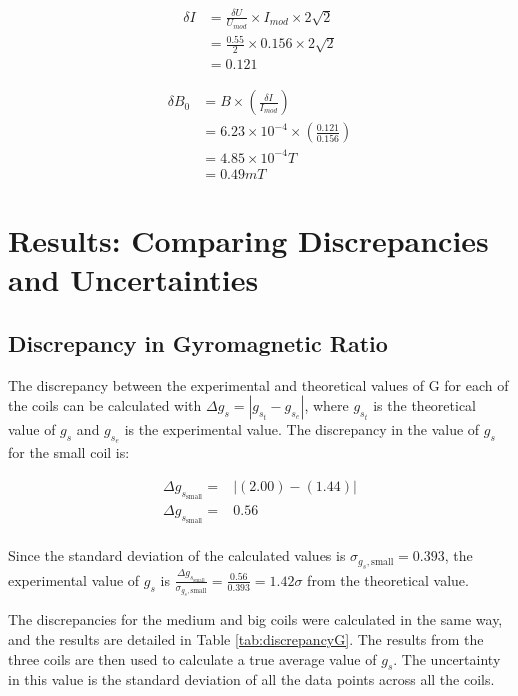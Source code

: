\documentclass[a4paper]{article}
\begin{document}
\begin{align*}
\delta I &= \frac{\delta U}{U_{mod}} \times  I_{mod} \times 2\sqrt{2} \\
         &= \frac{0.55}{2} \times 0.156 \times 2\sqrt{2} \\
         &= 0.121
\end{align*}

\begin{align*}
\delta B_0 &= B \times \left( \frac {\delta I} {I_{mod}} \right) \\
           &= 6.23 \times 10^{-4} \times \left( \frac {0.121} {0.156} \right) \\
           &= 4.85 \times 10^{-4} T \\
           &= 0.49 mT
\end{align*} 


\section{Results: Comparing Discrepancies and Uncertainties}

\subsection{Discrepancy in Gyromagnetic Ratio}
\qq The discrepancy between the experimental and theoretical values of G for
each of the coils can be calculated with \( \Delta g_s = | g_{s_t} - g_{s_e} |
\), where \( g_{s_t} \) is the theoretical value of \( g_s \) and \( g_{s_e} \)
is the experimental value. The discrepancy in the value of \( g_s \) for the
small coil is:

\begin{align*}
  \Delta g_{s_{\text{small}}} =& \left| (2.00) - (1.44) \right| \\
  \Delta g_{s_{\text{small}}} =& 0.56 \\
\end{align*}

Since the standard deviation of the calculated values is
\( \sigma_{g_s, \text{small}} = 0.393 \), the experimental value of \( g_s \) is \(
\frac{\Delta g_{s_{\text{small}}}}{\sigma_{g_s, \text{small}}} = \frac{0.56}{0.393} = 1.42
\sigma \) from the theoretical value.

\qq The discrepancies for the medium and big coils were calculated in the same
way, and the results are detailed in Table \ref{tab:discrepancyG}. The results
from the three coils are then used to calculate a true average value of \( g_s
\). The uncertainty in this value is the standard deviation of all the data
points across all the coils.
\end{document}
